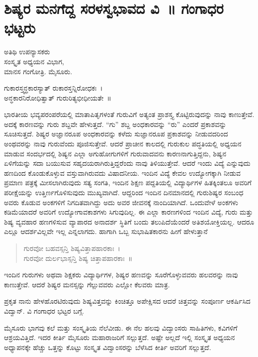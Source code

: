 {\fontsize{14}{16}\selectfont
\chapter{ಶಿಷ್ಯರ ಮನಗೆದ್ದ ಸರಳಸ್ವಭಾವದ ವಿ~॥ ಗಂಗಾಧರ ಭಟ್ಟರು}

\begin{center}
\smallskip
ಅತಿಥಿ ಉಪನ್ಯಾಸಕರು\\
ಸಂಸ್ಕೃತ ಅಧ್ಯಯನ ವಿಭಾಗ,\\
ಮಾನಸ ಗಂಗೋತ್ರಿ. ಮೈಸೂರು.
\addrule
\end{center}
\begin{center}
ಗುಕಾರಸ್ತ್ವನ್ಧಕಾರಸ್ಯಾತ್ ರುಕಾರಸ್ತನ್ನಿರೋಧಕಃ~।\\
ಅನ್ಧಕಾರನಿರೋಧಿತ್ವಾತ್ ಗುರುರಿತ್ಯಭೀಧೀಯತೇ~॥
\end{center}
ಭಾರತೀಯ ಭವ್ಯಪರಂಪರೆಯಲ್ಲಿ ಮಾತಾಪಿತೃಗಳಂತೆ ಗುರುವಿಗೆ ಅತ್ಯಂತ ಪ್ರಾಶಸ್ತ್ಯ ಕೊಟ್ಟಿರುವುದನ್ನು ನಾವು ಕಾಣುತ್ತೇವೆ. ಅದಕ್ಕೆ ಕಾರಣವನ್ನು ಗುರು ಶಬ್ದವೇ ಹೇಳುತ್ತದೆ. “ಗು” ಶಬ್ದ ಅಂಧಕಾರವನ್ನು “ರು” ಎಂದರೆ ಪ್ರಕಾಶವನ್ನು ಸೂಚಿಸುತ್ತದೆ. ಶಿಷ್ಯರ ಅಜ್ಞಾನರೂಪ ಅಂಧಕಾರವನ್ನು ಕಳೆದು ಸುಜ್ಞಾನರೂಪ ಪ್ರಕಾಶವನ್ನು ನೀಡುವದರಿಂದ ಅಂಥವರನ್ನು ನಾವು ಗುರುವೆಂದು ಪೂಜಿಸುತ್ತೇವೆ. ಆದರೆ ಪ್ರಾಚೀನ ಕಾಲದಲ್ಲಿ ಗುರುಕುಲ ಪದ್ಧತಿಯಲ್ಲಿ ಅಧ್ಯಯನ ಮಾಡುವ ಸಂದರ್ಭದಲ್ಲಿ ಶಿಷ್ಯನ ಎಲ್ಲಾ ಅಗುಹೋಗುಗಳಿಗೆ ಗುರುವಾದವನು ಕಾರಣನಾಗುತ್ತಿದ್ದನು, ಶಿಷ್ಯನ ಏಳಿಗೆಯನ್ನು ಸದಾ ಬಯುಸುವ ಸಹೃದಯರಾಗಿರುತ್ತಿದ್ದರೆಂದು ನಾವು ತಿಳಿಯುತ್ತೇವೆ. ಆದರೆ ಇಂದು ವಿದ್ಯೆ ಎನ್ನುವುದು ಹಣದಿಂದ ಕೊಂಡುಕೊಳ್ಳುವ ವಸ್ತುವಾಗಿರುವದು ವಿಷಾದನೀಯ. ಇಂದಿನ ವಿದ್ಯೆ ಕೇವಲ ಉದ್ಯೋಗಕ್ಕಾಗಿ ನೀಡುವ ಪ್ರಮಾಣ ಪತ್ರಕ್ಕೆ ಮೀಸಲಾಗಿರುವುದು ಸತ್ಯ ಸಂಗತಿ, ಇಂದಿನ ಶಿಕ್ಷಣ ಪದ್ದತಿಯಲ್ಲಿ ವಿದ್ಯಾರ್ಥಿಗಳ ಹಿತಕ್ಕಿಂತಲೂ ಅವರಿಗೆ ಪರೀಕ್ಷೆಯನ್ನು ಉತ್ತಿರ್ಣಗೊಳಿಸುವುದು ಮುಖ್ಯವಾಗಿದೆ. ಆದ್ದರಿಂದ ಇಂದಿನ ದಿನಮಾನದಲ್ಲಿ ಗುರುಶಿಷ್ಯರ ಸಂಬಂಧ ಅವರು ಕೊಡುವ ಅಂಕಗಳಿಗೆ ನಿಗದಿತವಾಗಿದ್ದು ಅದು ಅವರ ಜೀವನಕ್ಕೆ ನಾಂದಿಯಾಗಿದೆ. ಒಂದುವೇಳೆ ಅಂಕಗಳು ಕಡಿಮೆಯಾದರೆ ಅವರಿಗೆ ಉದ್ಯೋಗಾವಕಾಶಗಳು ಸಿಗುವುದಿಲ್ಲ. ಈ ಎಲ್ಲಾ ಕಾರಣಗಳಿಂದ ಇಂದಿನ ವಿದ್ಯೆ, ಗುರು ಮತ್ತು ಶಿಷ್ಯ ವ್ಯವಹಾರ ಹಣಗಳಿಸುವ ವ್ಯಾಪಾರದ ಅನಾದರ್ಶ ಸ್ಥಿತಿಗೆ ಬಂದು ತಲುಪಿದೆಯೆಂದರೆ ಅತಿಶಯೋಕ್ತಿಯಲ್ಲ. ಆದರೂ ಎಲ್ಲೂ ಆದರ್ಶವಿಲ್ಲವೇ ಇಲ್ಲ ಎನ್ನಲಾಗದು. ಹಾಗಾಗಿ ಒಬ್ಬ ಸುಭಾಷಿತಕಾರನು ಹೀಗೆ ಹೇಳುತ್ತಾನೆ 
\begin{verse}
ಗುರವೋ ಬಹವಸ್ಸನ್ತಿ ಶಿಷ್ಯವಿತ್ತಾಪಹಾರಕಾಃ~।\\
ಗುರವೋ ದುರ್ಲಭಾಸ್ಸನ್ತಿ ಶಿಷ್ಯ ಚಿತ್ತಾಪಹಾರಕಾಃ~॥
\end{verse}
ಇಂದಿನ ಗುರುಗಳು ಅಥವಾ ಶಿಕ್ಷಕರು ವಿದ್ಯಾರ್ಥಿಗಳ, ಶಿಷ್ಯರ ಹಣವನ್ನು ಸೂರೆಗೊಳ್ಳುವವರು ಹಲವರನ್ನು ನಾವು ಕಾಣುತ್ತೇವೆ. ಆದರೆ ಶಿಷ್ಯರ ಮನಸ್ಸನ್ನು ಗೆಲ್ಲುವವರು ಎಲ್ಲೋ ಕೆಲವರು ಮಾತ್ರ.

ಪ್ರಕೃತ ನಾನು ಹೇಳಹೊರಟಿರುವುದು ಶಿಷ್ಯವಿತ್ತವನ್ನು ಕಿಂಚಿತ್ತೂ ಅಪೇಕ್ಷಿಸದ ಆದರೆ ಚಿತ್ತವನ್ನು ಸಂಪೂರ್ಣ ಆಕರ್ಷಿಸಿದ ವಿದ್ವಾನ್. ವಿ ಗಂಗಾಧರ ಭಟ್ಟರ ಬಗ್ಗೆ.

ಮೈಸೂರು ಭಾಗವು ಕಲೆ ಮತ್ತು ಸಂಸ್ಕೃತಿಯ ನೆಲೆವೀಡು. ಈ ನೆಲ ಹಲವು ವಿದ್ವಾಂಸರು ಸಾಹಿತಿಗಳು, ಕವಿಗಳಿಗೆ ಆಶ್ರಯವಿತ್ತಿದೆ. ಇದರ ಕೀರ್ತಿ ಮೈಸೂರು ಮಹಾರಾಜರಿಗೆ ಸಲ್ಲುತ್ತದೆ. ಅಷ್ಟೇ ಅಲ್ಲದೆ ಇಲ್ಲಿ ಸಂಸ್ಕೃತ ಅಧ್ಯಯನ ಅಧ್ಯಾಪನಕ್ಕೇ ಹೆಚ್ಚು ಒತ್ತನ್ನು ಕೊಟ್ಟು ಸಂಸ್ಕೃತ ವಿದ್ವಾಂಸರನ್ನು ಬೆಳೆಸಿದ ಕೀರ್ತಿ ಅವರಿಗೆ ಸಲ್ಲುತ್ತದೆ.

}
